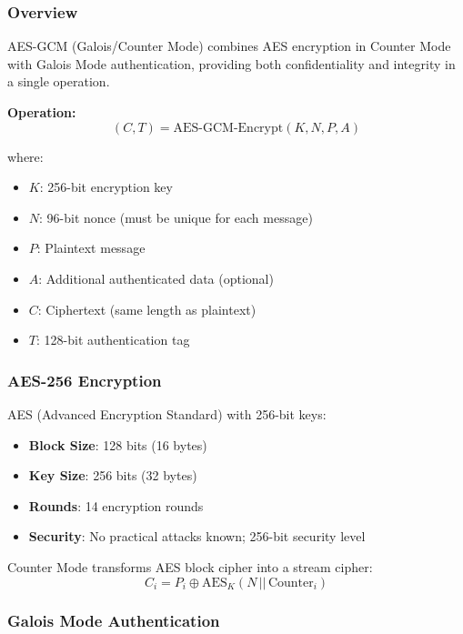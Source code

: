 \documentclass[12pt,a4paper]{article}
\begin{document}
\subsubsection{Overview}

AES-GCM (Galois/Counter Mode) combines AES encryption in Counter Mode with Galois Mode authentication, providing both confidentiality and integrity in a single operation.

\textbf{Operation:}
\begin{equation}
(C, T) = \text{AES-GCM-Encrypt}(K, N, P, A)
\end{equation}

where:
\begin{itemize}
    \item $K$: 256-bit encryption key
    \item $N$: 96-bit nonce (must be unique for each message)
    \item $P$: Plaintext message
    \item $A$: Additional authenticated data (optional)
    \item $C$: Ciphertext (same length as plaintext)
    \item $T$: 128-bit authentication tag
\end{itemize}

\subsubsection{AES-256 Encryption}

AES (Advanced Encryption Standard) with 256-bit keys:

\begin{itemize}
    \item \textbf{Block Size}: 128 bits (16 bytes)
    \item \textbf{Key Size}: 256 bits (32 bytes)
    \item \textbf{Rounds}: 14 encryption rounds
    \item \textbf{Security}: No practical attacks known; 256-bit security level
\end{itemize}

Counter Mode transforms AES block cipher into a stream cipher:
\begin{equation}
C_i = P_i \oplus \text{AES}_K(N \,||\, \text{Counter}_i)
\end{equation}

\subsubsection{Galois Mode Authentication}
\end{document}
